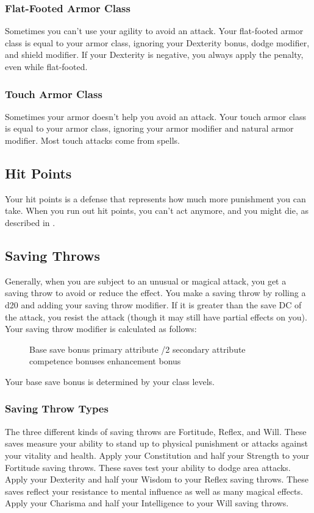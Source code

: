 \subsubsection{Flat-Footed Armor Class}
Sometimes you can't use your agility to avoid an attack. Your flat-footed armor class is equal to your armor class, ignoring your Dexterity bonus, dodge modifier, and shield modifier. If your Dexterity is negative, you always apply the penalty, even while flat-footed.

\subsubsection{Touch Armor Class}
Sometimes your armor doesn't help you avoid an attack. Your touch armor class is equal to your armor class, ignoring your armor modifier and natural armor modifier. Most touch attacks come from spells.

\subsection{Hit Points}
Your hit points is a defense that represents how much more punishment you can take. When you run out hit points, you can't act anymore, and you might die, as described in .

\subsection{Saving Throws}
Generally, when you are subject to an unusual or magical attack, you get a saving throw to avoid or reduce the effect. You make a saving throw by rolling a d20 and adding your saving throw modifier. If it is greater than the save DC of the attack, you resist the attack (though it may still have partial effects on you). Your saving throw modifier is calculated as follows:

\begin{figure}[h]
\centering Base save bonus \add primary attribute /2 secondary attribute \add competence bonuses \add enhancement bonus
\end{figure}

Your base save bonus is determined by your class levels.

\subsubsection{Saving Throw Types}
The three different kinds of saving throws are Fortitude, Reflex, and Will.
 These saves measure your ability to stand up to physical punishment or attacks against your vitality and health. Apply your Constitution and half your Strength to your Fortitude saving throws.
 These saves test your ability to dodge area attacks. Apply your Dexterity and half your Wisdom to your Reflex saving throws.
 These saves reflect your resistance to mental influence as well as many magical effects. Apply your Charisma and half your Intelligence to your Will saving throws.

